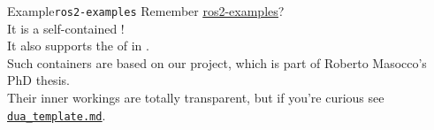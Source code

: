 \begin{frame}{Example}{\texttt{ros2-examples}}
  Remember \href{https://github.com/IntelligentSystemsLabUTV/ros2-examples}{\color{blue}\underline{ros2-examples}}?\\
  It is a self-contained !\\
  \bigskip
  It also supports the  of  in .\\
	Such containers are based on our \href{https://github.com/IntelligentSystemsLabUTV/dua-template}{} project, which is part of Roberto Masocco's PhD thesis.\\
  \bigskip
	Their inner workings are totally transparent, but if you're curious see \href{https://github.com/IntelligentSystemsLabUTV/ros2-examples/blob/humble/dua_template.md}{\color{blue}\underline{\texttt{dua\_template.md}}}.
\end{frame}
